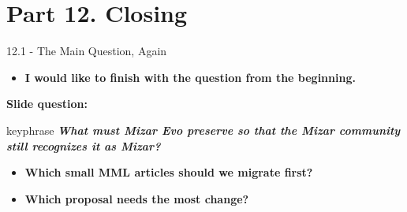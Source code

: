 \documentclass[aspectratio=169,11pt]{beamer}
\begin{document}
\section{Part 12. Closing}
\begin{frame}[fragile,t]{12.1 - The Main Question, Again}
\begin{itemize}
\setlength{\itemsep}{1pt}
\setlength{\parsep}{0pt}
\setlength{\parskip}{0pt}
\item \textcolor{blue!55!black}{\textbf{I would like to finish with the question from the beginning.}}
\end{itemize}
\smallskip
\textbf{Slide question:}
\begin{center}
\begin{beamercolorbox}[rounded=true,sep=2.5mm,wd=0.9\textwidth]{keyphrase}
\centering\itshape \textcolor{blue!55!black}{\textbf{What must Mizar Evo preserve so that the Mizar community}}\\ \textcolor{blue!55!black}{\textbf{still recognizes it as Mizar?}}
\end{beamercolorbox}
\end{center}
\begin{itemize}
\setlength{\itemsep}{1pt}
\setlength{\parsep}{0pt}
\setlength{\parskip}{0pt}
\item \textcolor{blue!55!black}{\textbf{Which small MML articles should we migrate first?}}
\item \textcolor{blue!55!black}{\textbf{Which proposal needs the most change?}}
\end{itemize}
\end{frame}
\end{document}
